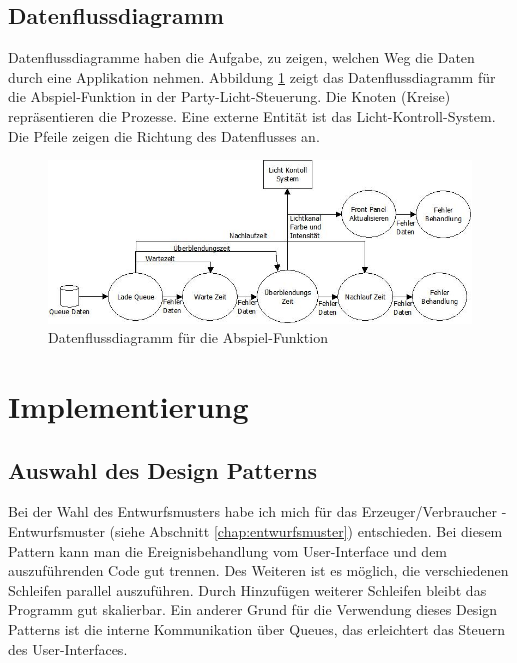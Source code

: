 \subsection{Datenflussdiagramm}
Datenflussdiagramme haben die Aufgabe, zu zeigen, welchen Weg die Daten durch eine Applikation nehmen. Abbildung \ref{fig:plan02} zeigt das Datenflussdiagramm für die Abspiel-Funktion
in der Party-Licht-Steuerung. Die Knoten (Kreise) repräsentieren die Prozesse. 
Eine externe Entität ist das Licht-Kontroll-System. Die Pfeile zeigen die Richtung des Datenflusses an.
	\begin{figure}[!ht]
	\centering
		\includegraphics[width=\textwidth]{Pics/play-dataflow.jpeg}
	\caption{Datenflussdiagramm für die Abspiel-Funktion}
	\label{fig:plan02}
	\end{figure}	

	

\section{Implementierung}
\label{chap:impl}
		\subsection{Auswahl des Design Patterns} %
		\label{chap:designpattern} %
Bei der Wahl des Entwurfsmusters habe ich mich für das Erzeuger/Verbraucher - Entwurfsmuster (siehe Abschnitt \ref{chap:entwurfsmuster}) entschieden. 
Bei diesem Pattern kann man die Ereignisbehandlung vom User-Interface und dem auszuführenden Code gut trennen. 
Des Weiteren ist es möglich, die verschiedenen Schleifen parallel auszuführen.
Durch Hinzufügen weiterer Schleifen bleibt das Programm gut skalierbar. 
Ein anderer Grund für die Verwendung dieses Design Patterns ist die interne Kommunikation über Queues, das erleichtert das Steuern des User-Interfaces.


